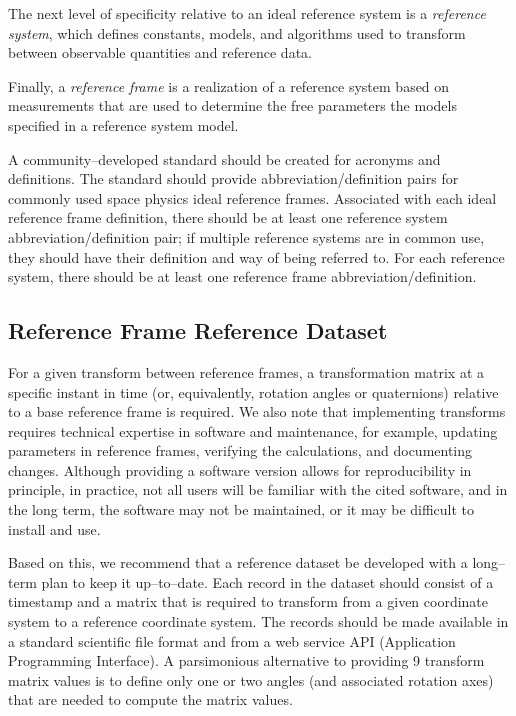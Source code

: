 \documentclass[draft]{agujournal2019}
\begin{document}
The next level of specificity relative to an ideal reference system is a {\it reference system}, which defines constants, models, and algorithms used to transform between observable quantities and reference data. 

Finally, a {\it reference frame} is a realization of a reference system based on measurements that are used to determine the free parameters the models specified in a reference system model. 

A community--developed standard should be created for acronyms and definitions. The standard should provide abbreviation/definition pairs for commonly used space physics ideal reference frames. Associated with each ideal reference frame definition, there should be at least one reference system abbreviation/definition pair; if multiple reference systems are in common use, they should have their definition and way of being referred to. For each reference system, there should be at least one reference frame abbreviation/definition.

\subsection{Reference Frame Reference Dataset}
\label{sect:reference-dataset}

For a given transform between reference frames, a transformation matrix at a specific instant in time (or, equivalently, rotation angles or quaternions) relative to a base reference frame is required. We also note that implementing transforms requires technical expertise in software and maintenance, for example, updating parameters in reference frames, verifying the calculations, and documenting changes. Although providing a software version allows for reproducibility in principle, in practice, not all users will be familiar with the cited software, and in the long term, the software may not be maintained, or it may be difficult to install and use. 

Based on this, we recommend that a reference dataset be developed with a long--term plan to keep it up--to--date. Each record in the dataset should consist of a timestamp and a matrix that is required to transform from a given coordinate system to a reference coordinate system. The records should be made available in a standard scientific file format and from a web service API (Application Programming Interface). A parsimonious alternative to providing 9 transform matrix values is to define only one or two angles (and associated rotation axes) that are needed to compute the matrix values.
\end{document}
